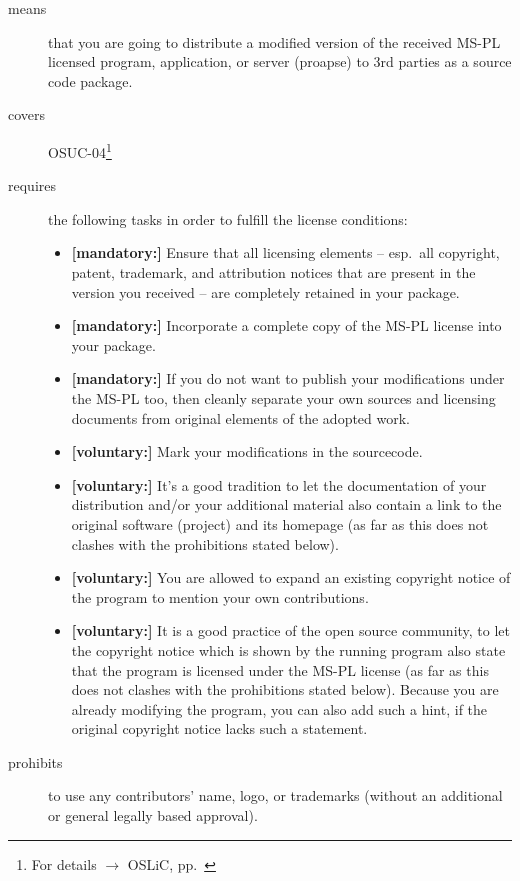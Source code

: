\begin{description}

\item[means] that you are going to distribute a modified version of the received
MS-PL licensed program, application, or server (proapse) to 3rd parties as a
source code package.

\item[covers] OSUC-04\footnote{For details $\rightarrow$ OSLiC, pp.\ \pageref{OSUC-04-DEF}}

\item[requires] the following tasks in order to fulfill the license conditions:
\begin{itemize}
  \item \textbf{[mandatory:]} Ensure that all licensing elements -- esp.\ all
  copyright, patent, trademark, and attribution notices that are present in the
  version you received -- are completely retained in your package.
 
  \item \textbf{[mandatory:]} Incorporate a complete copy of the MS-PL license
  into your package.
  
  \item \textbf{[mandatory:]} If you do not want to publish your modifications
  under the MS-PL too, then cleanly separate your own sources and licensing
  documents from original elements of the adopted work.
  
  \item \textbf{[voluntary:]} Mark your modifications in the sourcecode.
  
  \item \textbf{[voluntary:]} It's a good tradition to let the documentation of
  your distribution and/or your additional material also contain a link to the
  original software (project) and its homepage (as far as this does not clashes
  with the prohibitions stated below).
  
  \item \textbf{[voluntary:]} You are allowed to expand an existing copyright
  notice of the program to mention your own contributions.
  
  \item \textbf{[voluntary:]} It is a good practice of the open source
  community, to let the copyright notice which is shown by the running program
  also state that the program is licensed under the MS-PL license (as far as
  this does not clashes with the prohibitions stated below). Because you are
  already modifying the program, you can also add such a hint, if the 
  original copyright notice lacks such a statement.
    
\end{itemize}

\item[prohibits] to use any contributors' name, logo, or trademarks (without an
additional or general legally based approval).

\end{description}



